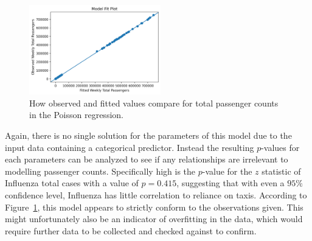 \documentclass[11pt]{article}
\begin{document}
\begin{multicols}{2}

    \begin{figure}[H]
        \includegraphics[width=0.51\textwidth]{../plots/diagnostic-Observed Weekly Total Passengers-vs-Fitted Weekly Total Passengers.png}
        \centering
        \caption{How observed and fitted values compare for total passenger counts in the Poisson regression.} %
        \label{fig:glm}
    \end{figure}

    Again, there is no single solution for the parameters of this model due to the input data containing a categorical predictor.
Instead the resulting $p$-values for each parameters can be analyzed to see if any relationships are irrelevant to modelling passenger counts.
Specifically high is the $p$-value for the $z$ statistic of Influenza total cases with a value of $p = 0.415$, 
suggesting that with even a $95\%$ confidence level, 
Influenza has little correlation to reliance on taxis.
According to Figure~\ref{fig:glm}, this model appears to strictly conform to the observations given.
This might unfortunately also be an indicator of overfitting in the data,
which would require further data to be collected and checked against to confirm.

\end{multicols}



\end{document}
